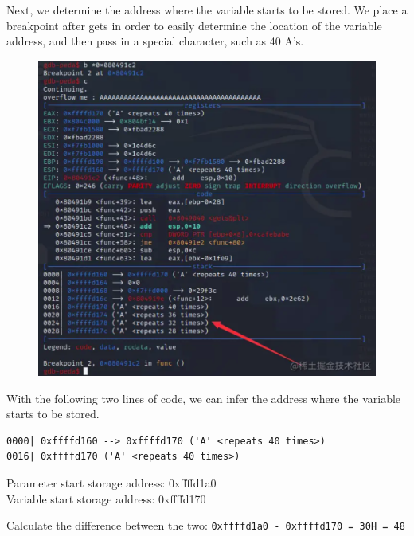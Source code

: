 \documentclass[a4paper]{exam}
\theoremstyle{definition}
\begin{document}
Next, we determine the address where the variable starts to be stored. We place a breakpoint after gets in order to easily determine the location of the variable address, and then pass in a special character, such as 40 A's.
\begin{figure}
\centering
\includegraphics[width=12cm]{./img/overflow_eg2.png}
\caption{}
\end{figure}

With the following two lines of code, we can infer the address where the variable starts to be stored.
\begin{verbatim}
0000| 0xffffd160 --> 0xffffd170 ('A' <repeats 40 times>)
0016| 0xffffd170 ('A' <repeats 40 times>)
\end{verbatim}


Parameter start storage address: 0xffffd1a0
\\ Variable start storage address: 0xffffd170

 Calculate the difference between the two: \texttt{0xffffd1a0 - 0xffffd170 = 30H = 48}
\end{document}

